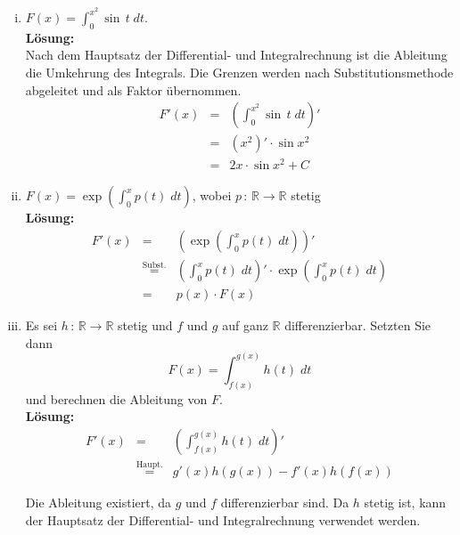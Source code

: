 \documentclass[11pt,a4paper,ngerman]{article}
\begin{document}
\begin{enumerate}[i)]
    \item $F(x) = \int_{0}^{x^2} \sin \, t \; dt$.\\

\textbf{Lösung:}\\

Nach dem Hauptsatz der Differential- und Integralrechnung ist die Ableitung die Umkehrung des Integrals. Die Grenzen werden nach Substitutionsmethode abgeleitet und als Faktor übernommen.
$$
\begin{array}{rcl}
F'(x)	&=& \left( \int_0^{x^2} \sin \, t \; dt\right)'\\
	&=& (x^2)' \cdot \sin x^2\\
	&=& 2x \cdot \sin x^2 + C
\end{array}
$$

    
    \item $F(x) = \exp \left( \int_{0}^{x} p(t)\; dt\right)$, wobei $p \, : \, \mathbb{R} \rightarrow \mathbb{R}$ stetig \\

\textbf{Lösung:}\\

$$
\begin{array}{rcl}
F'(x)	&=& \left( \exp \left( \int_0^x p(t) \; dt \right) \right)'\\
	&\stackrel{\text{Subst.}}{=}& \left( \int_0^x p(t) \; dt\right)' \cdot \exp \left( \int_0^x p(t) \; dt\right)\\
	&=& p(x) \cdot F(x)
\end{array}
$$

    \item Es sei $h \, : \, \mathbb{R} \rightarrow \mathbb{R}$ stetig und $f$ und $g$ auf ganz $\mathbb{R}$ differenzierbar. Setzten Sie dann
$$
    F(x) = \int_{f(x)}^{g(x)} h(t) \; dt
$$
und berechnen die Ableitung von $F$.\\

\textbf{Lösung:}\\

$$
\begin{array}{rcl}
F'(x)	&=& \left( \int_{f(x)}^{g(x)} h(t) \; dt \right)'\\
	&\stackrel{\text{Haupt.}}{=}& g'(x) h(g(x)) - f'(x) h (f(x))
\end{array}
$$

Die Ableitung existiert, da $g$ und $f$ differenzierbar sind. Da $h$ stetig ist, kann der Hauptsatz der Differential- und Integralrechnung verwendet werden.

\end{enumerate}
\end{document}

